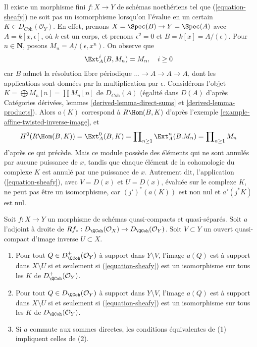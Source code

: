 \begin{example}
\label{example-not-supported-on-inverse-image}
Il existe un morphisme fini $f : X \to Y$ de schémas noethériens tel que (\ref{equation-sheafy}) ne soit pas un isomorphisme lorsqu'on l'évalue en un certain $K \in D_{\textit{Coh}}(\mathcal{O}_Y)$. En effet, prenons $X = \Spec(B) \to Y = \Spec(A)$ avec $A = k[x, \epsilon]$, où $k$ est un corps, et prenons $\epsilon^2 = 0$ et $B = k[x] = A/(\epsilon)$. Pour $n \in \mathbf{N}$, posons $M_n = A/(\epsilon, x^n)$. On observe que
$$
\Ext^i_A(B, M_n) = M_n,\quad i \geq 0
$$
car $B$ admet la résolution libre périodique $\ldots \to A \to A \to A$, dont les applications sont données par la multiplication par $\epsilon$. Considérons l'objet
$K = \bigoplus M_n[n] = \prod M_n[n]$
de $D_{\textit{Coh}}(A)$ (égalité dans $D(A)$ d'après Catégories dérivées, lemmes \ref{derived-lemma-direct-sums} et \ref{derived-lemma-products}). Alors $a(K)$ correspond à $R\Hom(B, K)$ d'après l'exemple \ref{example-affine-twisted-inverse-image}, et
$$
H^0(R\Hom(B, K)) = \Ext^0_A(B, K) =
\prod\nolimits_{n \geq 1} \Ext^n_A(B. M_n) = 
\prod\nolimits_{n \geq 1} M_n
$$
d'après ce qui précède. Mais ce module possède des éléments qui ne sont annulés par aucune puissance de $x$, tandis que chaque élément de la cohomologie du complexe $K$ est annulé par une puissance de $x$. Autrement dit, l'application (\ref{equation-sheafy}), avec $V = D(x)$ et $U = D(x)$, évaluée sur le complexe $K$, ne peut pas être un isomorphisme, car $(j')^*(a(K))$ est non nul et $a'(j^*K)$ est nul.
\end{example}

\begin{lemma}
\label{lemma-when-sheafy}
Soit $f : X \to Y$ un morphisme de schémas quasi-compacts et quasi-séparés. Soit $a$ l'adjoint à droite de $Rf_* : D_\QCoh(\mathcal{O}_X) \to D_\QCoh(\mathcal{O}_Y)$. Soit $V \subset Y$ un ouvert quasi-compact d'image inverse $U \subset X$.
\begin{enumerate}
\item Pour tout $Q \in D_\QCoh^+(\mathcal{O}_Y)$ à support dans $Y \setminus V$, l'image $a(Q)$ est à support dans $X \setminus U$ si et seulement si (\ref{equation-sheafy}) est un isomorphisme sur tous les $K$ de $D_\QCoh^+(\mathcal{O}_Y)$.
\item Pour tout $Q \in D_\QCoh(\mathcal{O}_Y)$ à support dans $Y \setminus V$, l'image $a(Q)$ est à support dans $X \setminus U$ si et seulement si (\ref{equation-sheafy}) est un isomorphisme sur tous les $K$ de $D_\QCoh(\mathcal{O}_Y)$.
\item Si $a$ commute aux sommes directes, les conditions équivalentes de (1) impliquent celles de (2).
\end{enumerate}
\end{lemma}

